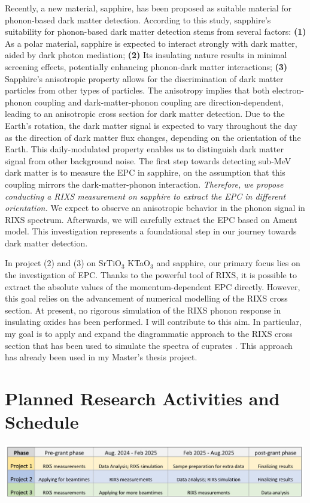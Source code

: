 \documentclass[11pt]{article}
\begin{document}
Recently, a new material, sapphire, has been proposed as suitable material for phonon-based dark matter detection\cite{griffin_directional_2018}. According to this study, sapphire's suitability for phonon-based dark matter detection stems from several factors: 
\textbf{(1)} As a polar material, sapphire is  expected to interact strongly with dark matter, aided by dark photon mediation; 
\textbf{(2)} Its insulating nature results in minimal screening effects, potentially enhancing phonon-dark matter interactions; 
\textbf{(3)} Sapphire's anisotropic property allows for the discrimination of dark matter particles from other types of particles. 
The anisotropy implies that both electron-phonon coupling and dark-matter-phonon coupling are direction-dependent\cite{griffin_directional_2018}, leading to an anisotropic cross section for dark matter detection. 
Due to the Earth's rotation, the dark matter signal is expected to vary throughout the day as the direction of dark matter flux changes, depending on the orientation of the Earth. 
This daily-modulated property enables us to distinguish dark matter signal from other background noise.
The first step towards detecting sub-MeV dark matter is to measure the EPC in sapphire, on the assumption that this coupling mirrors the dark-matter-phonon interaction. 
\textit{Therefore, we propose conducting a RIXS measurement on sapphire to extract the EPC in different orientation.}  
We expect to observe an anisotropic behavior in the phonon signal in RIXS spectrum. 
Afterwards, we will carefully extract the EPC based on Ament model\cite{ament_determining_2011}. 
This investigation represents a foundational step in our journey towards dark matter detection.

In project (2) and (3) on SrTiO$_{3}$ KTaO$_{3}$ and sapphire, our primary focus lies on the investigation of EPC. 
Thanks to the powerful tool of RIXS, it is possible to extract the absolute values of the momentum-dependent EPC directly. 
{However, this goal relies on the advancement of numerical modelling of the RIXS cross section. At present, no rigorous simulation of the RIXS phonon response in insulating oxides has been performed. I will contribute to this aim. In particular, my goal is to apply and expand the diagrammatic approach to the RIXS cross section that has been used to simulate the spectra of cuprates \cite{devereaux_directly_2016}. This approach has already been used in my Master's thesis project. }

\section{Planned Research Activities and Schedule}
\begin{center}
\includegraphics[width=0.99\textwidth]{figures/schedule.jpg}
\end{center}
\end{document}
